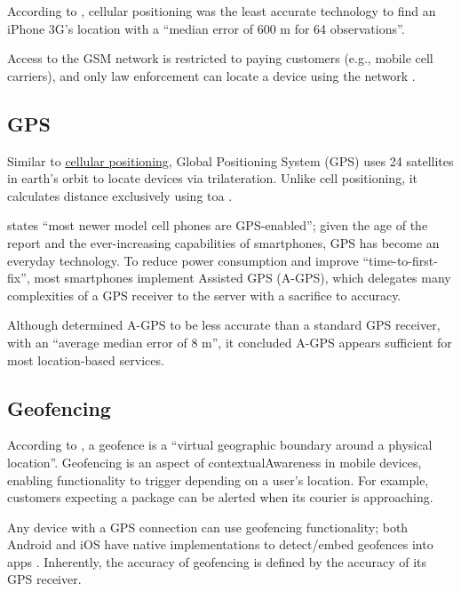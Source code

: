 According to \cite{locationComparison}, cellular
positioning was the least accurate technology to find an
iPhone 3G's location with a \enquote{median error of 600 m
  for 64 observations}.

Access to the GSM network is restricted to paying customers
(e.g., mobile cell carriers), and only law enforcement can
locate a device using the network
\parencite{howCellTowerTriWorks}.

\subsection{GPS} \label{ss:gps}

Similar to \hyperref[ss:cellPos]{cellular positioning},
Global Positioning System (GPS) uses 24 satellites in
earth's orbit to locate devices via \gls{trilateration}.
Unlike cell positioning, it calculates distance exclusively
using \gls{toa} \parencite{suveryOfCellPos}.

\cite{locationComparison} states \enquote{most newer model
  cell phones are GPS-enabled}; given the age of the report
and the ever-increasing capabilities of smartphones, GPS
has become an everyday technology.
To reduce power consumption and improve
\enquote{time-to-first-fix}, most smartphones implement
Assisted GPS (A-GPS), which delegates many complexities of
a GPS receiver to the server with a sacrifice to accuracy.

Although \cite{locationComparison} determined A-GPS to be
less accurate than a standard GPS receiver, with an
\enquote{average median error of 8 m}, it concluded A-GPS
appears sufficient for most location-based services.

\subsection{Geofencing}

According to \cite{whatIsGeofencing}, a geofence is a
\enquote{virtual geographic boundary around a physical
  location}.
Geofencing is an aspect of \gls{contextualAwareness} in
mobile devices, enabling functionality to trigger depending
on a user's location.
For example, customers expecting a package can be alerted
when its courier is approaching.

Any device with a GPS connection can use geofencing
functionality; both Android and iOS have native
implementations to detect/embed geofences into apps
\parencite{androidGeofencingApi,iosGeofencingApi}.
Inherently, the accuracy of geofencing is defined by the
accuracy of its GPS receiver.

